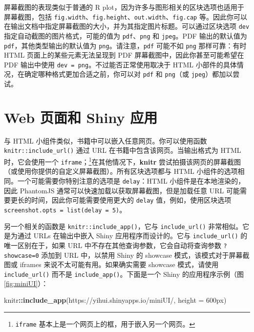 \documentclass[
  12pt,
]{krantz}
\newenvironment{Shaded}{\begin{snugshade}}{\end{snugshade}}
\newcommand{\AttributeTok}[1]{\textcolor[rgb]{0.13,0.29,0.53}{#1}}
\newcommand{\FunctionTok}[1]{\textcolor[rgb]{0.13,0.29,0.53}{\textbf{#1}}}
\newcommand{\NormalTok}[1]{#1}
\newcommand{\SpecialCharTok}[1]{\textcolor[rgb]{0.81,0.36,0.00}{\textbf{#1}}}
\newcommand{\StringTok}[1]{\textcolor[rgb]{0.31,0.60,0.02}{#1}}
\let\oldhref\href
\renewcommand{\href}[2]{#2\footnote{\url{#1}}}
\theoremstyle{definition}
\theoremstyle{definition}
\theoremstyle{definition}
\theoremstyle{definition}
\theoremstyle{remark}
\begin{document}
屏幕截图的表现类似于普通的 R plot，因为许多与图形相关的区块选项也适用于屏幕截图，包括 \texttt{fig.width}、\texttt{fig.height}、\texttt{out.width}、\texttt{fig.cap} 等。因此你可以在输出文档中指定屏幕截图的大小，并为其指定图片标题。可以通过区块选项 \texttt{dev} 指定自动截图的图片格式，可能的值为 \texttt{pdf}、\texttt{png} 和 \texttt{jpeg}。PDF 输出的默认值为 \texttt{pdf}，其他类型输出的默认值为 \texttt{png}。请注意，\texttt{pdf} 可能不如 \texttt{png} 那样可靠：有时 HTML 页面上的某些元素无法呈现到 PDF 屏幕截图中，因此你甚至可能希望在 PDF 输出中使用 \texttt{dev\ =\ \textquotesingle{}png\textquotesingle{}}。不过能否正常使用取决于 HTML 小部件的具体情况，在确定哪种格式更加合适之前，你可以对 \texttt{pdf} 和 \texttt{png}（或 \texttt{jpeg}）都加以尝试。

\section{Web 页面和 Shiny 应用}\label{web-ux9875ux9762ux548c-shiny-ux5e94ux7528}

与 HTML 小组件类似，书籍中可以嵌入任意网页。你可以使用函数 \texttt{knitr::include\_url()} 通过 URL 在书籍中包含该网页。当输出格式为 HTML 时，它会使用一个 \texttt{iframe}；\footnote{\texttt{iframe} 基本上是一个网页上的框，用于嵌入另一个网页。}在其他情况下，\textbf{knitr} 尝试拍摄该网页的屏幕截图（或使用你提供的自定义屏幕截图）。所有区块选项都与 HTML 小组件的选项相同。一个可能需要你特别注意的选项是 \texttt{delay}：HTML 小组件是在本地渲染的，因此 PhantomJS 通常可以快速加载以获取屏幕截图，但是加载任意 URL 可能需要更长的时间，因此你可能需要使用更大的 \texttt{delay} 值，例如，使用区块选项 \texttt{screenshot.opts\ =\ list(delay\ =\ 5)}。

另一个相关的函数是 \texttt{knitr::include\_app()}，它与 \texttt{include\_url()} 非常相似。它是为通过 URLs 在输出中嵌入 Shiny 应用程序而设计的。它与 \texttt{include\_url()} 的唯一区别在于，如果 URL 中不存在其他查询参数，它会自动将查询参数 \texttt{?showcase=0} 添加到 URL 中，以禁用 Shiny 的 showcase 模式，该模式对于屏幕截图或 iframes 来说不太可能有用。如果确实需要 showcase 模式，请使用 \texttt{include\_url()} 而不是 \texttt{include\_app()}。下面是一个 Shiny 的应用程序示例（图 \ref{fig:miniUI}）：

\let\ooldhref\href
\let\href\oldhref

\begin{Shaded}
\begin{Highlighting}[]
\NormalTok{knitr}\SpecialCharTok{::}\FunctionTok{include\_app}\NormalTok{(}\StringTok{\textquotesingle{}https://yihui.shinyapps.io/miniUI/\textquotesingle{}}\NormalTok{, }\AttributeTok{height =} \StringTok{\textquotesingle{}600px\textquotesingle{}}\NormalTok{)}
\end{Highlighting}
\end{Shaded}
\end{document}
